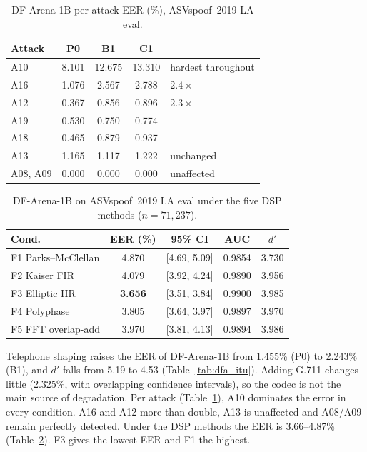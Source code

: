 \documentclass[conference]{IEEEtran}
\begin{document}
\begin{table}[t]
\centering
\caption{DF-Arena-1B per-attack EER (\%), ASVspoof~2019 LA eval.}
\label{tab:dfa_attack}
\begin{tabular}{lcccl}
\toprule
Attack & P0 & B1 & C1 & \\
\midrule
A10 & 8.101 & 12.675 & 13.310 & hardest throughout \\
A16 & 1.076 & 2.567 & 2.788 & $2.4\times$ \\
A12 & 0.367 & 0.856 & 0.896 & $2.3\times$ \\
A19 & 0.530 & 0.750 & 0.774 & \\
A18 & 0.465 & 0.879 & 0.937 & \\
A13 & 1.165 & 1.117 & 1.222 & unchanged \\
A08, A09 & 0.000 & 0.000 & 0.000 & unaffected \\
\bottomrule
\end{tabular}
\end{table}

\begin{table}[t]
\centering
\caption{DF-Arena-1B on ASVspoof~2019 LA eval under the five DSP methods ($n=71{,}237$).}
\label{tab:dfa_dsp}
\begin{tabular}{lcccc}
\toprule
Cond. & EER (\%) & 95\% CI & AUC & $d'$ \\
\midrule
F1 Parks--McClellan & 4.870 & [4.69, 5.09] & 0.9854 & 3.730 \\
F2 Kaiser FIR       & 4.079 & [3.92, 4.24] & 0.9890 & 3.956 \\
F3 Elliptic IIR     & \textbf{3.656} & [3.51, 3.84] & 0.9900 & 3.985 \\
F4 Polyphase        & 3.805 & [3.64, 3.97] & 0.9897 & 3.970 \\
F5 FFT overlap-add  & 3.970 & [3.81, 4.13] & 0.9894 & 3.986 \\
\bottomrule
\end{tabular}
\end{table}

Telephone shaping raises the EER of DF-Arena-1B from 1.455\% (P0) to
2.243\% (B1), and $d'$ falls from 5.19 to 4.53
(Table~\ref{tab:dfa_itu}). Adding G.711 changes little (2.325\%, with
overlapping confidence intervals), so the codec is not the main source of
degradation. Per attack (Table~\ref{tab:dfa_attack}), A10 dominates the
error in every condition. A16 and A12 more than double, A13 is unaffected
and A08/A09 remain perfectly detected. Under the DSP methods the EER is
3.66--4.87\% (Table~\ref{tab:dfa_dsp}). F3 gives the lowest EER and F1 the
highest.
\end{document}
